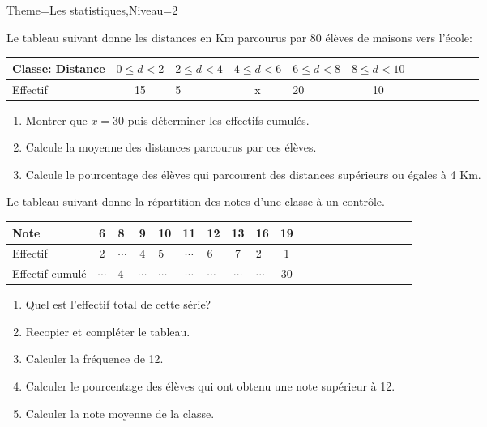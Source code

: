 \documentclass[a4paper,12pt]{article}
\begin{document}
\begin{Maquette}[Fiche]{Theme=Les statistiques,Niveau=2}
\begin{exercice}%
Le tableau suivant donne les distances en Km parcourus par 80 élèves de maisons vers l'école:
\begin{tabular}{|Oc|Oc|Oc|Oc|Oc|Oc|}
\hline 
Classe: Distance & $0\leq d<2$ & $2\leq d<4$ & $4\leq d<6$ & $6\leq d<8$ & $8\leq d<10$ \\ 
\hline 
Effectif & 15 & 5 & x & 20 & 10 \\ 
\hline 
\end{tabular} 
\begin{enumerate}
\item Montrer que $x=30$ puis déterminer les effectifs cumulés.
\item Calcule la moyenne des distances parcourus par ces élèves.
\item Calcule le pourcentage des élèves qui parcourent des distances supérieurs ou égales à 4 Km.
\end{enumerate}
\end{exercice}

\begin{exercice}
Le tableau suivant donne la répartition des notes d'une classe à un contrôle.

\begin{tabular}{|Oc|Oc|Oc|Oc|Oc|Oc|Oc|Oc|Oc|Oc|}
\hline 
Note & 6 & 8 & 9 & 10 & 11 & 12 & 13 & 16 & 19 \\ 
\hline 
Effectif & 2 & $\cdots$ & 4 & 5 & $\cdots$ & 6 & 7 & 2 & 1 \\ 
\hline 
Effectif cumulé & $\cdots$ & 4 & $\cdots$ & $\cdots$ & $\cdots$ & $\cdots$ & $\cdots$ & $\cdots$ & 30 \\ 
\hline 
\end{tabular} 
\begin{enumerate}
\item Quel est l'effectif total de cette série?
\item Recopier et compléter le tableau.
\item Calculer la fréquence de 12.
\item Calculer le pourcentage des élèves qui ont obtenu une note supérieur à 12.
\item Calculer la note moyenne de la classe.
\end{enumerate}
\end{exercice}



\end{Maquette}
\end{document}
